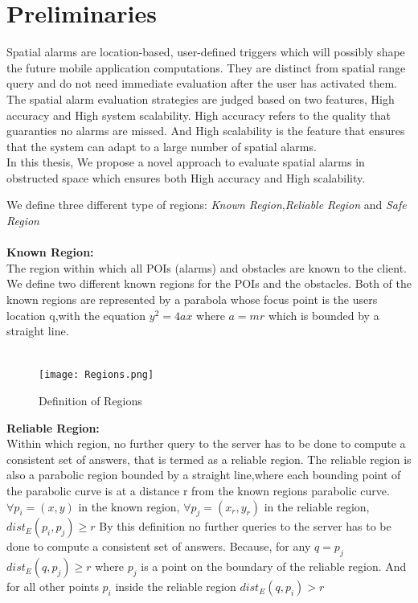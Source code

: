 \section{Preliminaries}
Spatial alarms are location-based, user-defined triggers which will possibly shape the future mobile application computations. They are distinct from spatial range query and do not need immediate evaluation after the user has activated them. The spatial alarm evaluation strategies are judged based on two features, High accuracy and High system scalability. High accuracy refers to the quality that guaranties no alarms are missed. And High scalability is the feature that ensures that the system can adapt to a large number of spatial alarms.\\
In this thesis, We propose a novel approach to evaluate spatial alarms in obstructed space which ensures both High accuracy and High scalability.

We define three different type of regions: \textit{Known Region},\textit{Reliable Region} and \textit{Safe Region}\\ \\

\textbf{Known Region:} \\
                    \hspace*{4cm}The region within which all POIs (alarms) and  obstacles are known to the client.
We define two different known regions for the POIs and the obstacles. Both of the known regions are represented by a parabola whose focus point is the users location q,with the equation $y^2=4ax$ where $a=mr$ which is bounded by a straight line. \\ \\

\begin{figure}[h]
  \texttt{[image: Regions.png]}
  \caption{Definition of Regions}
  \label{fig:defregion}
\end{figure}



\textbf{Reliable Region:}\\
\hspace*{4cm} Within which region, no further query to the server has to be done to compute a consistent set of answers, that is termed as a reliable region. The reliable region is also a parabolic region bounded by a straight line,where each bounding point of the parabolic curve is at a distance r from the known regions parabolic curve. $ \forall p_i=(x,y) $ in the known region, $ \forall p_j=(x_r,y_r) $ in the reliable region, $ dist_E(p_i,p_j)\geq r $ By this definition no further queries to the server has to be done to compute a consistent set of answers. Because, for any $q =p_j$ $ dist_E(q,p_j) \geq r$ where $p_j$ is a point on the boundary of the reliable region. And for all other points $ p_i $ inside the reliable region $  dist_E(q,p_i)>r$ \\ 


